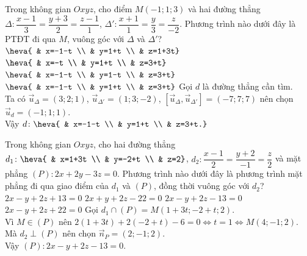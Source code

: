 \begin{ex}%
	Trong không gian $Oxyz$, cho điểm  $M(-1;1;3)$ và hai đường thẳng $\Delta\colon \dfrac{x-1}{3}=\dfrac{y+3}{2}=\dfrac{z-1}{1}$, $\Delta'\colon \dfrac{x+1}{1}=\dfrac{y}{3}=\dfrac{z}{-2}$. Phương trình nào dưới đây là PTĐT đi qua $M$, vuông góc với $\Delta$ và $\Delta'$?
	\choice
	{$\heva{ & x=-1-t \\ & y=1+t \\ & z=1+3t}$}
	{$\heva{ & x=-t \\ & y=1+t \\ & z=3+t}$}
	{$\heva{ & x=-1-t \\ & y=1-t \\ & z=3+t}$}
	{\True $\heva{ & x=-1-t \\ & y=1+t \\ & z=3+t}$}
	\loigiai
	{
		Gọi $d$ là đường thẳng cần tìm.\\
		Ta có $\overrightarrow{u}_{\Delta}=(3;2;1)$, $\overrightarrow{u}_{\Delta'}=(1;3;-2)$, $\left[\overrightarrow{u}_{\Delta},\overrightarrow{u}_{\Delta'}\right]=(-7;7;7)$ nên chọn $\overrightarrow{u}_{d}=(-1;1;1)$.\\
		Vậy $d\colon \heva{ & x=-1-t \\ & y=1+t \\ & z=3+t.}$
	}
\end{ex}

\begin{ex}%
	Trong không gian $Oxyz$, cho hai đường thẳng $d_1\colon \heva{ & x=1+3t \\ & y=-2+t \\ & z=2}$, $d_2\colon \dfrac{x-1}{2}=\dfrac{y+2}{-1}=\dfrac{z}{2}$ và mặt phẳng $(P)\colon 2x+2y-3z=0$. Phương trình nào dưới đây là phương trình mặt phẳng đi qua giao điểm của $d_1$ và $(P)$, đồng thời vuông góc với $d_2$?
	\choice
	{$2x-y+2z+13=0$}
	{$2x+y+2z-22=0$}
	{\True $2x-y+2z-13=0$}
	{$2x-y+2z+22=0$}
	\loigiai
	{
		Gọi $d_1\cap (P)=M(1+3t;-2+t;2)$.\\
		Vì $M\in (P)$ nên $2(1+3t)+2(-2+t)-6=0\Leftrightarrow t=1 \Leftrightarrow M(4;-1;2)$.\\
		Mà $d_2\perp (P)$ nên chọn $\overrightarrow{n}_{P}=(2;-1;2)$.\\
		Vậy $(P)\colon 2x-y+2z-13=0$.
	}
\end{ex}

